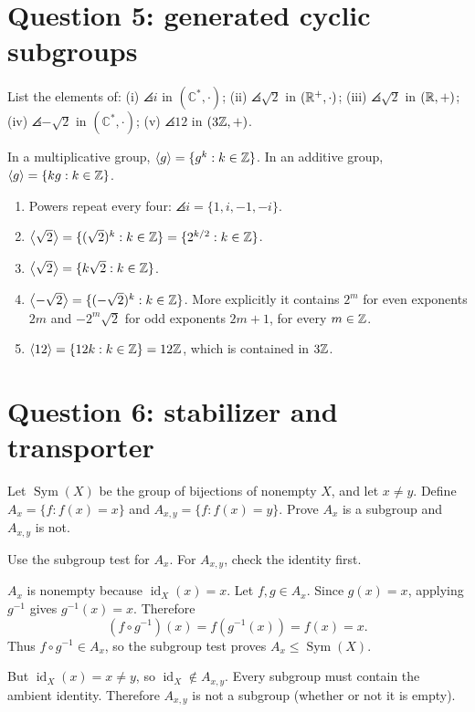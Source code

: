 \documentclass[11pt,openany]{book}
\newcommand{\C}{\mathbb C}\newcommand{\PP}{\mathcal P}
\newcommand{\id}{\operatorname{id}}\newcommand{\Sym}{\operatorname{Sym}}
\begin{document}
\section{Question 5: generated cyclic subgroups}
\begin{questionbox}
List the elements of: (i) $\angles i$ in $(\C^*,\cdot)$; (ii) $\angles{\sqrt2}$ in $(\mathbb R^+,\cdot)$; (iii) $\angles{\sqrt2}$ in $(\mathbb R,+)$; (iv) $\angles{-\sqrt2}$ in $(\C^*,\cdot)$; (v) $\angles{12}$ in $(3\mathbb Z,+)$.
\end{questionbox}
\begin{approachbox}
In a multiplicative group, $\left\langle g\right\rangle=\{g^k:k\in\mathbb Z\}$. In an additive group, $\left\langle g\right\rangle=\{kg:k\in\mathbb Z\}$.
\end{approachbox}
\begin{solutionbox}
\begin{enumerate}[label=(\roman*)]
\item Powers repeat every four: $\angles i=\{1,i,-1,-i\}$.
\item $\left\langle\sqrt2\right\rangle=\{(\sqrt2)^k:k\in\mathbb Z\}=\{2^{k/2}:k\in\mathbb Z\}$.
\item $\left\langle\sqrt2\right\rangle=\{k\sqrt2:k\in\mathbb Z\}$.
\item $\left\langle-\sqrt2\right\rangle=\{(-\sqrt2)^k:k\in\mathbb Z\}$. More explicitly it contains $2^m$ for even exponents $2m$ and $-2^m\sqrt2$ for odd exponents $2m+1$, for every $m\in\mathbb Z$.
\item $\left\langle12\right\rangle=\{12k:k\in\mathbb Z\}=12\mathbb Z$, which is contained in $3\mathbb Z$.
\end{enumerate}
\end{solutionbox}

\section{Question 6: stabilizer and transporter}
\begin{questionbox}
Let $\Sym(X)$ be the group of bijections of nonempty $X$, and let $x\ne y$. Define
$A_x=\{f:f(x)=x\}$ and $A_{x,y}=\{f:f(x)=y\}$. Prove $A_x$ is a subgroup and $A_{x,y}$ is not.
\end{questionbox}
\begin{approachbox}
Use the subgroup test for $A_x$. For $A_{x,y}$, check the identity first.
\end{approachbox}
\begin{solutionbox}
$A_x$ is nonempty because $\id_X(x)=x$. Let $f,g\in A_x$. Since $g(x)=x$, applying $g^{-1}$ gives $g^{-1}(x)=x$. Therefore
\[
(f\circ g^{-1})(x)=f(g^{-1}(x))=f(x)=x.
\]
Thus $f\circ g^{-1}\in A_x$, so the subgroup test proves $A_x\le\Sym(X)$.

But $\id_X(x)=x\ne y$, so $\id_X\notin A_{x,y}$. Every subgroup must contain the ambient identity. Therefore $A_{x,y}$ is not a subgroup (whether or not it is empty).
\end{solutionbox}
\end{document}
